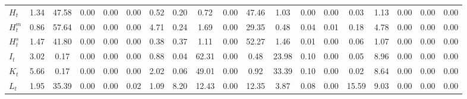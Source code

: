 \begin{center}
\begin{longtable}{lcccccccccccccccccc}
$ H_t               $	 & 	             1.34	 & 	            47.58	 & 	             0.00	 & 	             0.00	 & 	             0.00	 & 	             0.52	 & 	             0.20	 & 	             0.72	 & 	             0.00	 & 	            47.46	 & 	             1.03	 & 	             0.00	 & 	             0.00	 & 	             0.03	 & 	             1.13	 & 	             0.00	 & 	             0.00	 & 	             0.00 \\ 
$ H^m_t             $	 & 	             0.86	 & 	            57.64	 & 	             0.00	 & 	             0.00	 & 	             0.00	 & 	             4.71	 & 	             0.24	 & 	             1.69	 & 	             0.00	 & 	            29.35	 & 	             0.48	 & 	             0.04	 & 	             0.01	 & 	             0.18	 & 	             4.78	 & 	             0.00	 & 	             0.00	 & 	             0.00 \\ 
$ H^s_t             $	 & 	             1.47	 & 	            41.80	 & 	             0.00	 & 	             0.00	 & 	             0.00	 & 	             0.38	 & 	             0.37	 & 	             1.11	 & 	             0.00	 & 	            52.27	 & 	             1.46	 & 	             0.01	 & 	             0.00	 & 	             0.06	 & 	             1.07	 & 	             0.00	 & 	             0.00	 & 	             0.00 \\ 
$ I_t               $	 & 	             3.02	 & 	             0.17	 & 	             0.00	 & 	             0.00	 & 	             0.00	 & 	             0.88	 & 	             0.04	 & 	            62.31	 & 	             0.00	 & 	             0.48	 & 	            23.98	 & 	             0.10	 & 	             0.00	 & 	             0.05	 & 	             8.96	 & 	             0.00	 & 	             0.00	 & 	             0.00 \\ 
$ K_t               $	 & 	             5.66	 & 	             0.17	 & 	             0.00	 & 	             0.00	 & 	             0.00	 & 	             2.02	 & 	             0.06	 & 	            49.01	 & 	             0.00	 & 	             0.92	 & 	            33.39	 & 	             0.10	 & 	             0.00	 & 	             0.02	 & 	             8.64	 & 	             0.00	 & 	             0.00	 & 	             0.00 \\ 
$ L_t               $	 & 	             1.95	 & 	            35.39	 & 	             0.00	 & 	             0.00	 & 	             0.02	 & 	             1.09	 & 	             8.20	 & 	            12.43	 & 	             0.00	 & 	            12.35	 & 	             3.87	 & 	             0.08	 & 	             0.00	 & 	            15.59	 & 	             9.03	 & 	             0.00	 & 	             0.00	 & 	             0.00 \\ 

\end{longtable}
\end{center}
